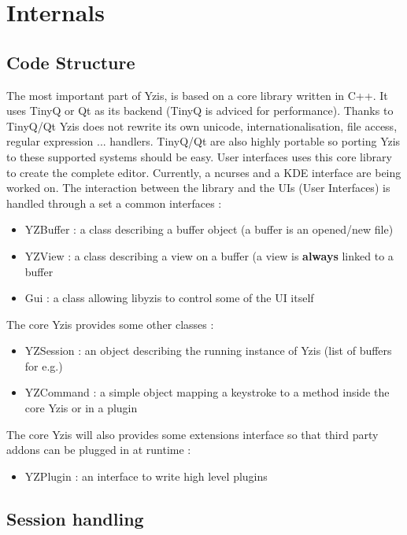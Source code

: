 
\newpage
\section{Internals}
\subsection{Code Structure}
The most important part of Yzis, is based on a core library written in C++. It uses TinyQ or Qt as its backend (TinyQ is adviced for performance). Thanks to TinyQ/Qt Yzis does not rewrite its own unicode, internationalisation, file access, regular expression ... handlers. TinyQ/Qt are also highly portable so porting Yzis to these supported systems should be easy.\newline
User interfaces uses this core library to create the complete editor. Currently, a ncurses and a KDE interface are being worked on.  The interaction between the library and the UIs (User Interfaces) is handled through a set a common interfaces :
\begin{itemize}
\item YZBuffer : a class describing a buffer object (a buffer is an opened/new file)
\item YZView : a class describing a view on a buffer (a view is {\bf always} linked to a buffer
\item Gui : a class allowing libyzis to control some of the UI itself
\end{itemize}
The core Yzis provides some other classes :
\begin{itemize}
\item YZSession : an object describing the running instance of Yzis (list of buffers for e.g.)
\item YZCommand : a simple object mapping a keystroke to a method inside the core Yzis or in a plugin
\end{itemize}
The core Yzis will also provides some extensions interface so that third party addons can be plugged in at runtime :
\begin{itemize}
\item YZPlugin : an interface to write high level plugins
\end{itemize}

\newpage
\subsection{Session handling}

